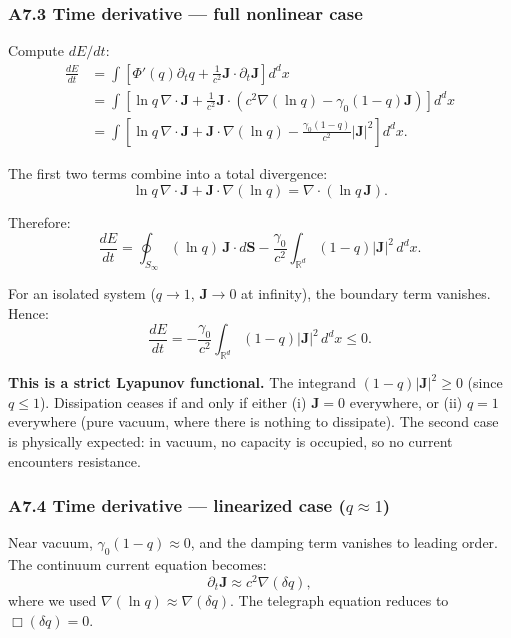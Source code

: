 \documentclass[reprint]{revtex4-2}
\begin{document}
\subsubsection{A7.3 Time derivative --- full nonlinear case}

Compute $dE/dt$:
\begin{align}
\frac{dE}{dt} &= \int \left[\Phi'(q)\partial_t q + \frac{1}{c^2}\mathbf{J}\cdot\partial_t\mathbf{J}\right] d^d x \nonumber \\
&= \int \left[\ln q\,\nabla\cdot\mathbf{J} + \frac{1}{c^2}\mathbf{J}\cdot\left(c^2\nabla(\ln q) - \gamma_0(1-q)\mathbf{J}\right)\right] d^d x \nonumber \\
&= \int \left[\ln q\,\nabla\cdot\mathbf{J} + \mathbf{J}\cdot\nabla(\ln q) - \frac{\gamma_0(1-q)}{c^2}|\mathbf{J}|^2\right] d^d x.
\end{align}

The first two terms combine into a total divergence:
\begin{equation}
\ln q\,\nabla\cdot\mathbf{J} + \mathbf{J}\cdot\nabla(\ln q) = \nabla\cdot(\ln q\,\mathbf{J}).
\end{equation}

Therefore:
\begin{equation}
\frac{dE}{dt} = \oint_{S_\infty} (\ln q)\,\mathbf{J}\cdot d\mathbf{S} - \frac{\gamma_0}{c^2}\int_{\mathbb{R}^d} (1-q)|\mathbf{J}|^2\,d^d x.
\end{equation}

For an isolated system ($q\to 1$, $\mathbf{J}\to 0$ at infinity), the boundary term vanishes. Hence:
\begin{equation}
\boxed{\frac{dE}{dt} = -\frac{\gamma_0}{c^2}\int_{\mathbb{R}^d} (1-q)|\mathbf{J}|^2\,d^d x \le 0}.
\label{eq:energy_dissipation_nonlinear}
\end{equation}

\textbf{This is a strict Lyapunov functional.} The integrand $(1-q)|\mathbf{J}|^2 \ge 0$ (since $q\le 1$). Dissipation ceases if and only if either (i) $\mathbf{J}=0$ everywhere, or (ii) $q=1$ everywhere (pure vacuum, where there is nothing to dissipate). The second case is physically expected: in vacuum, no capacity is occupied, so no current encounters resistance.

\subsubsection{A7.4 Time derivative --- linearized case ($q\approx 1$)}

Near vacuum, $\gamma_0(1-q) \approx 0$, and the damping term vanishes to leading order. The continuum current equation becomes:
\begin{equation}
\partial_t\mathbf{J} \approx c^2\nabla(\delta q),
\end{equation}
where we used $\nabla(\ln q) \approx \nabla(\delta q)$. The telegraph equation reduces to $\Box(\delta q)=0$.
\end{document}
